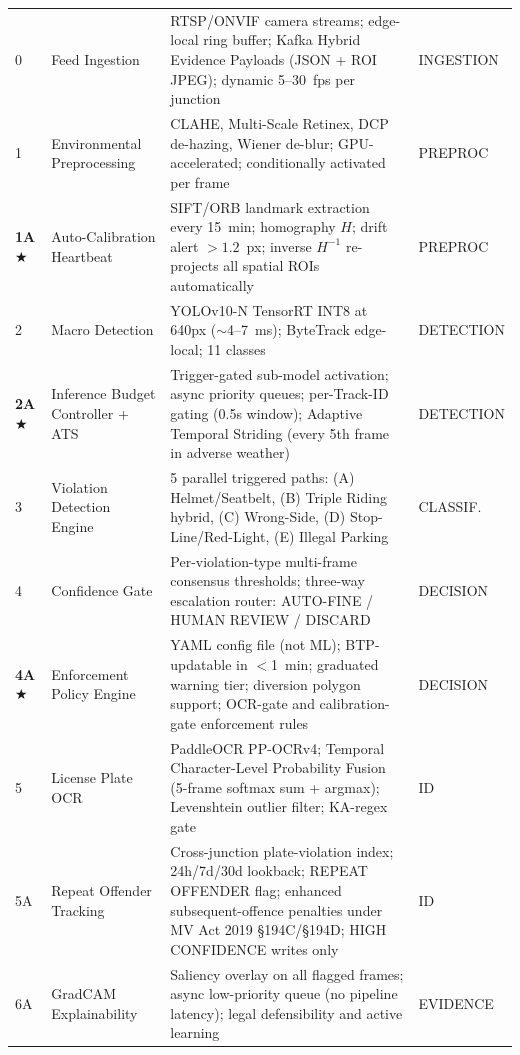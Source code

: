 \documentclass[11pt,a4paper]{article}
\begin{document}
\begin{longtable}{C{1.2cm} L{3cm} L{6.8cm} L{2.5cm}}
    0 & Feed Ingestion & RTSP/ONVIF camera streams; edge-local ring buffer; Kafka Hybrid Evidence Payloads (JSON + ROI JPEG); dynamic 5–30~fps per junction & INGESTION \\
    1 & Environmental Preprocessing & CLAHE, Multi-Scale Retinex, DCP de-hazing, Wiener de-blur; GPU-accelerated; conditionally activated per frame & PREPROC \\
    \textcolor{accentorange}{\textbf{1A $\bigstar$}} & Auto-Calibration Heartbeat & SIFT/ORB landmark extraction every 15~min; homography $H$; drift alert $> 1.2$~px; inverse $H^{-1}$ re-projects all spatial ROIs automatically & PREPROC \\
    2 & Macro Detection & YOLOv10-N TensorRT INT8 at 640px ($\sim$4–7~ms); ByteTrack edge-local; 11 classes & DETECTION \\
    \textcolor{accentorange}{\textbf{2A $\bigstar$}} & Inference Budget Controller + ATS & Trigger-gated sub-model activation; async priority queues; per-Track-ID gating (0.5s window); Adaptive Temporal Striding (every 5th frame in adverse weather) & DETECTION \\
    3 & Violation Detection Engine & 5 parallel triggered paths: (A) Helmet/Seatbelt, (B) Triple Riding hybrid, (C) Wrong-Side, (D) Stop-Line/Red-Light, (E) Illegal Parking & CLASSIF. \\
    4 & Confidence Gate & Per-violation-type multi-frame consensus thresholds; three-way escalation router: AUTO-FINE / HUMAN REVIEW / DISCARD & DECISION \\
    \textcolor{accentorange}{\textbf{4A $\bigstar$}} & Enforcement Policy Engine & YAML config file (not ML); BTP-updatable in $<$1~min; graduated warning tier; diversion polygon support; OCR-gate and calibration-gate enforcement rules & DECISION \\
    5 & License Plate OCR & PaddleOCR PP-OCRv4; Temporal Character-Level Probability Fusion (5-frame softmax sum + argmax); Levenshtein outlier filter; KA-regex gate & ID \\
    5A & Repeat Offender Tracking & Cross-junction plate-violation index; 24h/7d/30d lookback; REPEAT OFFENDER flag; enhanced subsequent-offence penalties under MV Act 2019 \S194C/\S194D; HIGH CONFIDENCE writes only & ID \\
    6A & GradCAM Explainability & Saliency overlay on all flagged frames; async low-priority queue (no pipeline latency); legal defensibility and active learning & EVIDENCE \\

\end{longtable}
\end{document}
